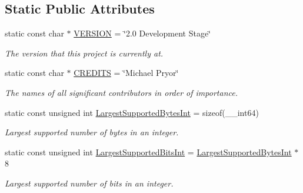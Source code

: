\subsection*{Static Public Attributes}
\begin{DoxyCompactItemize}
\item 
\hypertarget{class_utility_a9847ce4a21abef1de7dc04f4849f4384}{
static const char $\ast$ \hyperlink{class_utility_a9847ce4a21abef1de7dc04f4849f4384}{VERSION} = \char`\"{}2.0 Development Stage\char`\"{}}
\label{class_utility_a9847ce4a21abef1de7dc04f4849f4384}

\begin{DoxyCompactList}\small\item\em The version that this project is currently at. \item\end{DoxyCompactList}\item 
\hypertarget{class_utility_ab78d62aeb89cf5847943512d422454ec}{
static const char $\ast$ \hyperlink{class_utility_ab78d62aeb89cf5847943512d422454ec}{CREDITS} = \char`\"{}Michael Pryor\char`\"{}}
\label{class_utility_ab78d62aeb89cf5847943512d422454ec}

\begin{DoxyCompactList}\small\item\em The names of all significant contributors in order of importance. \item\end{DoxyCompactList}\item 
\hypertarget{class_utility_a1a17222360aeac0c7e8b5a9b3b13cc58}{
static const unsigned int \hyperlink{class_utility_a1a17222360aeac0c7e8b5a9b3b13cc58}{LargestSupportedBytesInt} = sizeof(\_\-\_\-int64)}
\label{class_utility_a1a17222360aeac0c7e8b5a9b3b13cc58}

\begin{DoxyCompactList}\small\item\em Largest supported number of bytes in an integer. \item\end{DoxyCompactList}\item 
\hypertarget{class_utility_aecfbcd7ef189efdf916f62b8b85b46f6}{
static const unsigned int \hyperlink{class_utility_aecfbcd7ef189efdf916f62b8b85b46f6}{LargestSupportedBitsInt} = \hyperlink{class_utility_a1a17222360aeac0c7e8b5a9b3b13cc58}{LargestSupportedBytesInt} $\ast$ 8}
\label{class_utility_aecfbcd7ef189efdf916f62b8b85b46f6}

\begin{DoxyCompactList}\small\item\em Largest supported number of bits in an integer. \item\end{DoxyCompactList}\end{DoxyCompactItemize}


